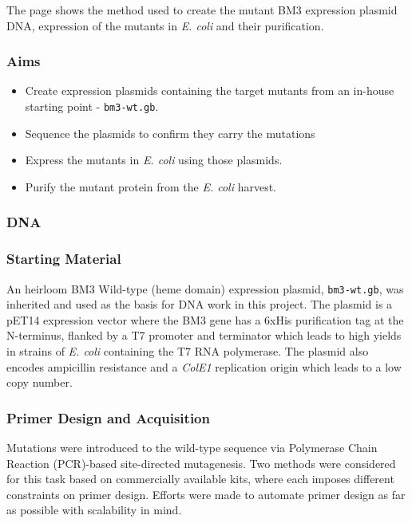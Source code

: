 \documentclass{article}
\begin{document}
The page shows the method used to create the mutant BM3 expression plasmid DNA, 
expression of the mutants in \textit{E. coli} and their purification.

\subsubsection{Aims}

\begin{itemize}
	\item Create expression plasmids containing the target mutants from an in-house starting point - \texttt{bm3-wt.gb}.
	\item Sequence the plasmids to confirm they carry the mutations
	\item Express the mutants in \textit{E. coli} using those plasmids.
	\item Purify the mutant protein from the \textit{E. coli} harvest.
\end{itemize}


\subsubsection{DNA}

\subsubsection{Starting Material}

An heirloom BM3 Wild-type (heme domain) expression plasmid, \texttt{bm3-wt.gb}, 
was inherited and used as the basis for DNA work in this project.
The plasmid is a pET14 expression vector where the BM3 gene has a 6xHis purification tag at the N-terminus,
flanked by a T7 promoter and terminator which leads to high yields in strains of \textit{E. coli} containing the T7 RNA polymerase.
The plasmid also encodes ampicillin resistance and a \textit{ColE1} replication origin which leads to a low copy number.


\subsubsection{Primer Design and Acquisition}

Mutations were introduced to the wild-type sequence via Polymerase Chain Reaction (PCR)-based site-directed mutagenesis.
Two methods were considered for this task based on commercially available kits, where each imposes different constraints on primer design.
Efforts were made to automate primer design as far as possible with scalability in mind.
\end{document}
